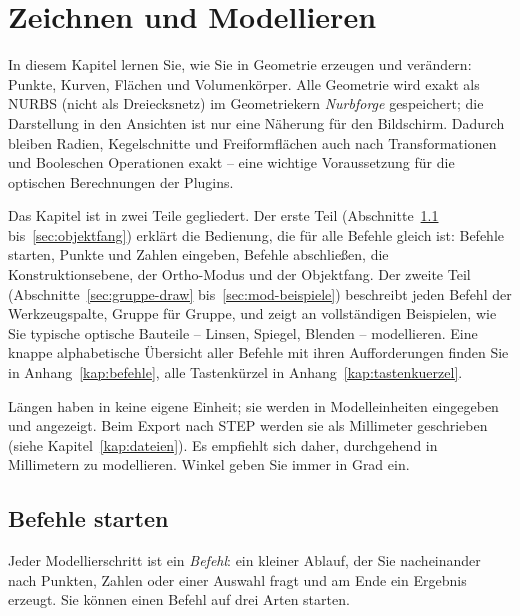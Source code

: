 \chapter{Zeichnen und Modellieren}\label{kap:modellieren}
\sloppy %

In diesem Kapitel lernen Sie, wie Sie in \produkt{} Geometrie erzeugen und verändern: Punkte,
Kurven, Flächen und Volumenkörper. Alle Geometrie wird exakt als NURBS (nicht als Dreiecksnetz)
im Geometriekern \emph{Nurbforge} gespeichert; die Darstellung in den Ansichten ist nur eine
Näherung für den Bildschirm. Dadurch bleiben Radien, Kegelschnitte und Freiformflächen auch nach
Transformationen und Booleschen Operationen exakt -- eine wichtige Voraussetzung für die
optischen Berechnungen der Plugins.

Das Kapitel ist in zwei Teile gegliedert. Der erste Teil
(Abschnitte~\ref{sec:befehle-starten} bis~\ref{sec:objektfang}) erklärt die Bedienung, die für
alle Befehle gleich ist: Befehle starten, Punkte und Zahlen eingeben, Befehle abschließen, die
Konstruktionsebene, der Ortho-Modus und der Objektfang. Der zweite Teil
(Abschnitte~\ref{sec:gruppe-draw} bis~\ref{sec:mod-beispiele}) beschreibt jeden Befehl der
Werkzeugspalte, Gruppe für Gruppe, und zeigt an vollständigen Beispielen, wie Sie typische
optische Bauteile -- Linsen, Spiegel, Blenden -- modellieren. Eine knappe alphabetische
Übersicht aller Befehle mit ihren Aufforderungen finden Sie in Anhang~\ref{kap:befehle}, alle
Tastenkürzel in Anhang~\ref{kap:tastenkuerzel}.

\begin{hinweis}
Längen haben in \produkt{} keine eigene Einheit; sie werden in Modelleinheiten eingegeben und
angezeigt. Beim Export nach STEP werden sie als Millimeter geschrieben (siehe
Kapitel~\ref{kap:dateien}). Es empfiehlt sich daher, durchgehend in Millimetern zu modellieren.
Winkel geben Sie immer in Grad ein.
\end{hinweis}

\section{Befehle starten}\label{sec:befehle-starten}

Jeder Modellierschritt ist ein \emph{Befehl}: ein kleiner Ablauf, der Sie nacheinander nach
Punkten, Zahlen oder einer Auswahl fragt und am Ende ein Ergebnis erzeugt. Sie können einen
Befehl auf drei Arten starten.

